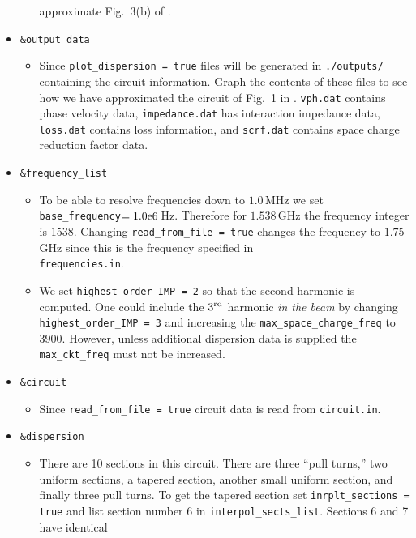\documentclass{article}
\begin{document}
\begin{itemize}
\begin{itemize}
    approximate Fig.~3(b) of \cite{abe:clhtwtc00}.
  \end{itemize}
\item {\tt \&output\_data}
  \begin{itemize}
  \item Since {\tt plot\_dispersion = true} files will be generated in
    {\tt ./outputs/} containing the circuit information. Graph the contents
    of these files to see
    how we have approximated the circuit of Fig.~1 in \cite{abe:clhtwtc00}.
    {\tt vph.dat} contains phase velocity data,
    {\tt impedance.dat} has interaction impedance data,
    {\tt loss.dat} contains loss information, and
    {\tt scrf.dat} contains space charge reduction factor data.
  \end{itemize}
\item {\tt \&frequency\_list}
  \begin{itemize}
  \item To be able to resolve frequencies down to $1.0\,$MHz we set\\
    {\tt base\_frequency}$= 1.0{\rm e}6\,$Hz. Therefore for $1.538\,$GHz the
    frequency integer is $1538$. Changing {\tt read\_from\_file = true}
    changes the frequency to $1.75\,$GHz since this is the frequency specified
    in\\ {\tt frequencies.in}.
  \item We set {\tt highest\_order\_IMP = 2} so that the second harmonic is
    computed. One could include the $3^{\rm rd}$ harmonic {\em in the beam}
    by changing {\tt highest\_order\_IMP = 3} and increasing the
    {\tt max\_space\_charge\_freq} to $3900$. However, unless
    additional dispersion data is supplied
    the {\tt max\_ckt\_freq} must not be increased.
  \end{itemize}
\item {\tt \&circuit}
  \begin{itemize}
  \item Since {\tt read\_from\_file = true} circuit data is read from
    {\tt circuit.in}.
  \end{itemize}
\item {\tt \&dispersion}
  \begin{itemize}
  \item There are 10 sections in this circuit. There are three ``pull
    turns,'' two uniform sections, a tapered section, another small
    uniform section, and finally three pull turns. To get the tapered
    section set {\tt inrplt\_sections = true} and list section number
    6 in {\tt interpol\_sects\_list}. Sections 6 and 7 have identical

\end{itemize}
\end{itemize}
\end{document}
